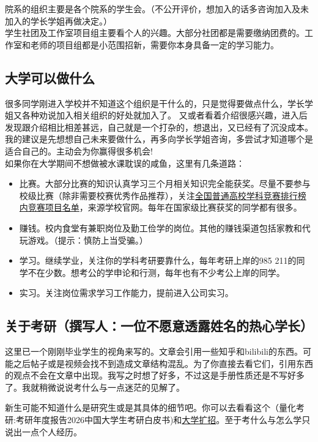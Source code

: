 \documentclass[12pt]{article} %
\begin{document}
	院系的组织主要是各个院系的学生会。（不公开评价，想加入的话多咨询加入及未加入的学长学姐再做决定。）\\
	
	学生社团及工作室项目组主要看个人的兴趣。大部分社团都是需要缴纳团费的。工作室和老师的项目组都是小范围招新，需要你本身具备一定的学习能力。\\
	
	\subsection{大学可以做什么}
	很多同学刚进入学校并不知道这个组织是干什么的，只是觉得要做点什么，学长学姐又各种劝说加入相关组织的好处就加入了。
	又或者看着介绍很感兴趣，进入后发现跟介绍相比相差甚远，自己就是一个打杂的，想退出，又已经有了沉没成本。\\
	
	我的建议是先想想自己未来要做什么，再多向学长学姐咨询，多尝试才知道哪个是适合自己的。主动会为你赢得很多机会!\\
	
	如果你在大学期间不想做被水课耽误的咸鱼，这里有几条道路：
	
	\begin{itemize}
		\item 比赛。大部分比赛的知识认真学习三个月相关知识完全能获奖。尽量不要参与校级比赛（除非需要校赛优秀作品推荐），关注\href{https://jwc.hebiace.edu.cn/info/1020/1394.htm}{全国普通高校学科竞赛排行榜内竞赛项目名单}，来源学校官网。每年在国家级比赛获奖的同学都有很多。
		\item 赚钱。校内食堂有兼职岗位及勤工俭学的岗位。其他的赚钱渠道包括家教和代玩游戏。（提示：慎防上当受骗。）
		\item 学习。继续学业，关注你的学科考研要靠什么，每年考研上岸的985 211的同学不在少数。想考公的学申论和行测，每年也有不少考公上岸的同学。
		\item 实习。关注岗位需求学习工作能力，提前进入公司实习。
	\end{itemize}
	\subsection{关于考研（撰写人：一位不愿意透露姓名的热心学长）} %
	这里已一个刚刚毕业学生的视角来写的。文章会引用一些知乎和bilibili的东西。可能之后帖子或是视频会找不到造成文章结构混乱。为了你直接去看它们，引用东西的观点不会在文章中出现。我写之时想了好多，不过这是手册性质还是不写好多了。我就稍微说说考什么与一点迷茫的见解了。

	新生可能不知道什么是研究生或是其具体的细节吧。你可以去看看这个（量化考研:考研年度报告2026中国大学生考研白皮书)和\href{https://baike.baidu.com/item/\%E5\%A4\%A7\%E5\%AD\%A6\%E6\%89\%A9\%E6\%8B\%9B/3705148\#5-2}{大学扩招}。至于考什么与怎么学只说出一点个人经历。
\end{document}
